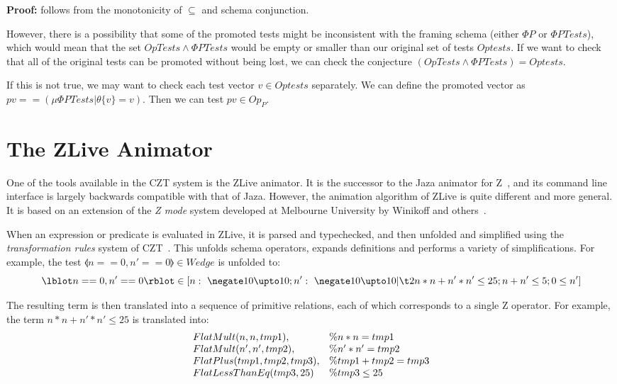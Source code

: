 \documentclass{llncs}
\begin{document}
\textbf{Proof:} follows from the monotonicity of $\subseteq$ and schema
conjunction.

However, there is a possibility that some of the promoted tests
might be inconsistent with the framing schema (either $\Phi P$ or $\Phi
PTests$), which would mean that the set $OpTests \land \Phi PTests$
would be empty or smaller than our original set of tests $Optests$.
If we want to check that all of the original tests can be promoted without
being lost, we can check the conjecture 
$(OpTests \land \Phi PTests) = Optests$.

If this is not true, we may want to check each test vector $v \in Optests$
separately.  We can define the promoted vector as 
$pv == (\mu \Phi PTests | \theta \{v\} = v)$.
Then we can test $pv \in Op_P$. 



\section{The ZLive Animator}\label{sect:zlive}

One of the tools available in the CZT system is the ZLive animator.
It is the successor to the Jaza animator for Z~\cite{utting:jaza},
and its command line interface is largely backwards compatible with that of
Jaza.  However, the animation algorithm of ZLive is quite different and
more general.  It is based on an extension of the \emph{Z mode} system
developed at Melbourne University by Winikoff and
others~\cite{kazmierczak:animation98,winikoff:modes-subtypes98}.

When an expression or predicate is evaluated in ZLive, it is
parsed and typechecked, and then unfolded and simplified using
the \emph{transformation rules} system of CZT~\cite{utting:rules07}.
This unfolds schema operators, expands definitions and performs a
variety of simplifications.  For example, the test $\lblot n==0, n'==0
\rblot \in Wedge$ is unfolded to:
\[
  \lblot n == 0 , n' == 0 \rblot \in 
 [ n :~\negate 10 \upto 10; n' :~\negate 10 \upto 10 | \\
   \t2 n * n + n' * n'  \leq 25; n + n' \leq 5; 0 \leq n' ]
\]

The resulting term is then translated into a sequence of primitive
relations, each of which corresponds to a single Z operator.
For example, the term $n * n + n' * n'  \leq 25$ is 
translated into:
\[
\begin{array}{l@{\quad}l}
   FlatMult(n, n, tmp1),       & \% n * n = tmp1 \\
   FlatMult(n', n', tmp2),     & \% n' * n' = tmp2 \\
   FlatPlus(tmp1, tmp2, tmp3), & \% tmp1 + tmp2 = tmp3 \\
   FlatLessThanEq(tmp3, 25)    & \% tmp3 \leq 25
\end{array}
\]
\end{document}
